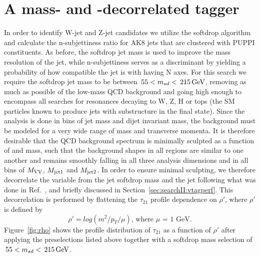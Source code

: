 \section{A mass- and \PT-decorrelated tagger}
\label{sec:searchIII:ddt}
In order to identify W-jet and Z-jet candidates we utilize the softdrop algorithm and calculate the n-subjettiness ratio \nsubj for AK8 jets that are clustered with PUPPI constituents. As before, the softdrop jet mass is used to improve the mass resolution of the jet, while n-subjettiness serves as a discriminant by yielding a probability of how compatible the jet is with having N axes. For this search we require the softdrop jet mass to be between $\text{\,55} < m_{sd} < \text{\,215}{\ensuremath{\,\text{Ge\hspace{-.08em}V}}}$, removing as much as possible of the low-mass QCD background and going high enough to encompass all searches for resonances decaying to W, Z, H or tops (the SM particles known to produce jets with substructure in the final state). Since the analysis is done in bins of jet mass and dijet invariant mass, the background must be modeled for a very wide range of mass and transverse momenta. It is therefore desirable that the QCD background spectrum is minimally sculpted as a function of \PT and mass, such that the background shapes in all regions are similar to one another and remains smoothly falling in all three analysis dimensions and in all bins of $M_{\rm VV}$, $M_{\rm jet1}$ and $M_{\rm jet2}$. In order to ensure minimal sculpting, we therefore decorrelate the \nsubj variable from the jet softdrop mass and the jet \PT following what was done in Ref.~\cite{Dolen:2016kst}, and briefly discussed in Section~\ref{sec:searchII:vtagperf}. This decorrelation is performed by flattening the $\tau_{21}$ profile dependence on $\rho'$, where $\rho'$ is defined by
\begin{equation}
\rho' = log(m^2/p_T/\mu) \textrm{, where $\mu$ = 1 GeV}.
\end{equation}
Figure~\ref{fig:rho} shows the profile distribution of $\tau_{21}$ as a function of $\rho'$ after applying the preselections listed above together with a softdrop mass selection of $\text{\,55} < m_{sd} < \text{\,215}{\ensuremath{\,\text{Ge\hspace{-.08em}V}}}$.
